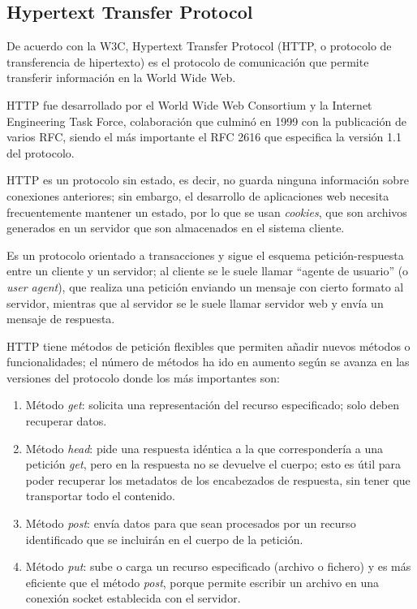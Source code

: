 \subsection{Hypertext Transfer Protocol}
De acuerdo con la W3C\cite{noauthor_http_nodate}, Hypertext Transfer Protocol (HTTP, o protocolo de transferencia de hipertexto) es el protocolo de comunicación que permite transferir información en la World Wide Web.


HTTP fue desarrollado por el World Wide Web Consortium y la Internet Engineering Task Force, colaboración que culminó en 1999 con la publicación de varios RFC, siendo el más importante el RFC 2616 que especifica la versión 1.1 del protocolo.


HTTP es un protocolo sin estado, es decir, no guarda ninguna información sobre conexiones anteriores; sin embargo, el desarrollo de aplicaciones web necesita frecuentemente mantener un estado, por lo que se usan \textit{cookies}, que son archivos generados en un servidor que son almacenados en el sistema cliente.


Es un protocolo orientado a transacciones y sigue el esquema petición-respuesta entre un cliente y un servidor; al cliente se le suele llamar ``agente de usuario'' (o \textit{user agent}), que realiza una petición enviando un mensaje con cierto formato al servidor, mientras que al servidor se le suele llamar servidor web y envía un mensaje de respuesta. 


HTTP tiene métodos de petición flexibles que permiten añadir nuevos métodos o funcionalidades; el número de métodos ha ido en aumento según se avanza en las versiones del protocolo donde los más importantes son:


\begin{enumerate}
    \item Método \textit{get}: solicita una representación del recurso especificado; solo deben recuperar datos. 
    \item Método \textit{head}: pide una respuesta idéntica a la que correspondería a una petición \textit{get}, pero en la respuesta no se devuelve el cuerpo; esto es útil para poder recuperar los metadatos de los encabezados de respuesta, sin tener que transportar todo el contenido.
    \item Método \textit{post}: envía datos para que sean procesados por un recurso identificado que se incluirán en el cuerpo de la petición. 
    \item Método \textit{put}: sube o carga un recurso especificado (archivo o fichero) y es más eficiente que el método \textit{post}, porque permite escribir un archivo en una conexión socket establecida con el servidor.
\end{enumerate}